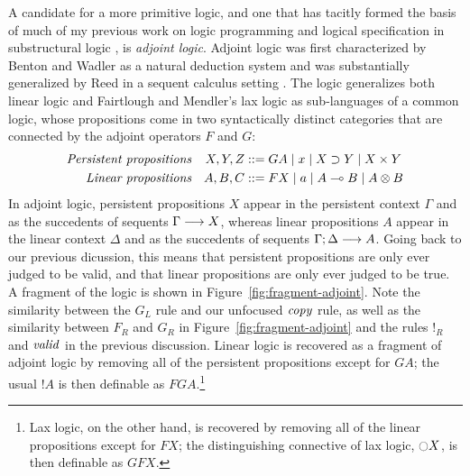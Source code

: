 A candidate for a more primitive logic, and one that has tacitly
formed the basis of much of my previous work on logic programming and
logical specification in substructural logic
\cite{pfenning09substructural,simmons11weak,simmons11logical}, 
is {\it adjoint logic}.
Adjoint logic was first characterized by Benton and Wadler as a
natural deduction system \cite{benton96linear} and was substantially
generalized by Reed in a sequent calculus setting
\cite{reed09judgmental}. The logic generalizes both linear logic and
Fairtlough and Mendler's lax logic \cite{fairtlough95propositional}
as sub-languages of a common logic, whose propositions come
in two syntactically distinct categories that are connected by the
adjoint operators $F$ and $G$:
\begin{align*}
\mbox{\it Persistent propositions} & &
X, Y, Z & ::= G A \mid x \mid X \supset Y \mid X \times Y\\
\mbox{\it Linear propositions} & & 
A, B, C & ::= F X \mid a \mid A \multimap B \mid A \otimes B
\end{align*}
In adjoint logic, persistent propositions $X$ appear in the
persistent context $\Gamma$ and as the succedents of sequents
${\Gamma} \longrightarrow {X} \mathstrut$, whereas linear propositions $A$ appear in
the linear context $\Delta$ and as the succedents of sequents
${\Gamma};{\Delta} \longrightarrow {A} \mathstrut$. Going back to our previous dicussion,
this means that persistent propositions are only ever judged
to be valid, and that linear propositions are only ever judged
to be true. A fragment of the logic is shown in
Figure~\ref{fig:fragment-adjoint}.  Note the similarity between the
$G_L$ rule and our unfocused ${\it copy}$ rule, as well as the
similarity between $F_R$ and $G_R$ in
Figure~\ref{fig:fragment-adjoint} and the rules ${!}_R$ and ${\it
  valid}$ in the previous discussion.  Linear logic is recovered as a
fragment of adjoint logic by removing all of the persistent
propositions except for $GA$; the usual ${!}A$ is then definable as
$FGA$.\footnote{Lax logic, on the other hand, is recovered by removing
  all of the linear propositions except for $FX$; the distinguishing
  connective of lax logic, $\ocircle X$, is then definable as $GFX$.}

